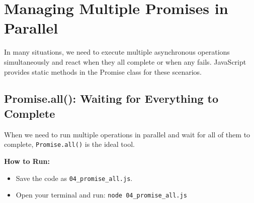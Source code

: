 \documentclass[12pt,letterpaper]{article}
\begin{document}
\section{Managing Multiple Promises in Parallel}

In many situations, we need to execute multiple asynchronous operations simultaneously and react when they all complete or when any fails. JavaScript provides static methods in the Promise class for these scenarios.

\subsection{Promise.all(): Waiting for Everything to Complete}

When we need to run multiple operations in parallel and wait for all of them to complete, \texttt{\textcolor{accentColor}{Promise.all()}} is the ideal tool.

\textbf{How to Run:}
\begin{itemize}
    \item Save the code as \verb|04_promise_all.js|.
    \item Open your terminal and run: \verb|node 04_promise_all.js|
\end{itemize}
\end{document}
